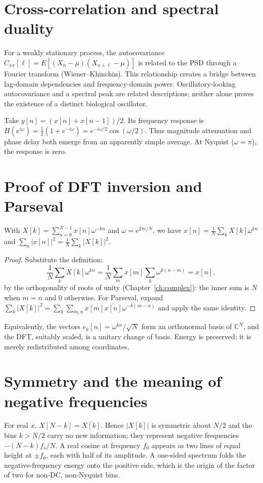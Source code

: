 \section{Cross-correlation and spectral duality}
For a weakly stationary process, the autocovariance $C_{xx}[\ell]=E[(X_n-\mu)(X_{n+\ell}-\mu)]$ is related to the PSD through a Fourier transform (Wiener--Khinchin). This relationship creates a bridge between lag-domain dependencies and frequency-domain power. Oscillatory-looking autocovariance and a spectral peak are related descriptions; neither alone proves the existence of a distinct biological oscillator.

\begin{workedexample}
Take $y[n]=(x[n]+x[n-1])/2$. Its frequency response is $H(e^{i\omega})=\tfrac12(1+e^{-i\omega})=e^{-i\omega/2}\cos(\omega/2)$. Thus magnitude attenuation and phase delay both emerge from an apparently simple average. At Nyquist ($\omega=\pi$), the response is zero.
\end{workedexample}
\section{Proof of DFT inversion and Parseval}
\begin{theorem}
With $X[k]=\sum_{n=0}^{N-1}x[n]\omega^{-kn}$ and $\omega=e^{2\pi i/N}$, we have $x[n]=\frac1N\sum_kX[k]\omega^{kn}$ and $\sum_n|x[n]|^2=\frac1N\sum_k|X[k]|^2$.
\end{theorem}
\begin{proof}
Substitute the definition:
\[
\frac1N\sum_kX[k]\omega^{kn}=\frac1N\sum_mx[m]\sum_k\omega^{k(n-m)}=x[n],
\]
by the orthogonality of roots of unity (Chapter~\ref{ch:complex}): the inner sum is $N$ when $m=n$ and $0$ otherwise. For Parseval, expand $\sum_k|X[k]|^2=\sum_k\sum_{m,n}x[m]\overline{x[n]}\omega^{-k(m-n)}$ and apply the same identity.
\end{proof}
Equivalently, the vectors $e_k[n]=\omega^{kn}/\sqrt N$ form an orthonormal basis of $\mathbb C^N$, and the DFT, suitably scaled, is a unitary change of basis. Energy is preserved; it is merely redistributed among coordinates.

\section{Symmetry and the meaning of negative frequencies}
For real $x$, $X[N-k]=\overline{X[k]}$. Hence $|X[k]|$ is symmetric about $N/2$ and the bins $k>N/2$ carry no new information; they represent negative frequencies $-(N-k)f_s/N$. A real cosine at frequency $f_0$ appears as two lines of equal height at $\pm f_0$, each with half of its amplitude. A one-sided spectrum folds the negative-frequency energy onto the positive side, which is the origin of the factor of two for non-DC, non-Nyquist bins.

